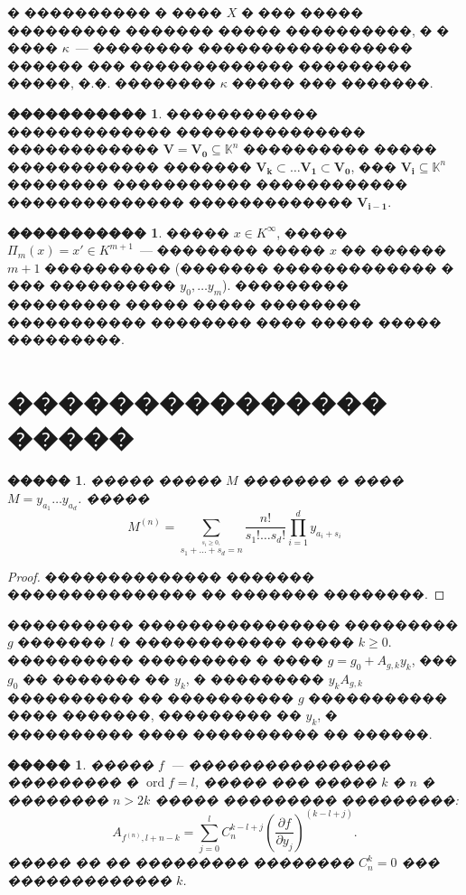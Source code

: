 \documentclass[16pt]{article}
\DeclareMathOperator{\ord}{ord}
\renewcommand{\ge}{\geqslant} %
\theoremstyle{plain}
\newtheorem{lemma}[theorem]{�����}
\theoremstyle{definition}
\newtheorem{definition}[theorem]{�����������}
\theoremstyle{remark}
\begin{document}
� ���������� � ���� $X$ � ��� ����� ��������� ������� �����
����������, � � ���� $\kappa$~--- �������� ����������������� ������
��� ������������� ��������� �����, �.�. �������� $\kappa$
����� ��� �������.


\begin{definition} ������������ ������������� ��������������� ������������
$\mathbf{V}=\mathbf{V_0}\subseteq \mathbb{K}^n$ ���������� ����� ������������ �������
$\mathbf{V_k}\subset\ldots\mathbf{V_1}\subset\mathbf{V_0}$, ���
$\mathbf{V_i}\subseteq \mathbb{K}^n$ �������� ����������� ������������ �������������� �������������
$\mathbf{V_{i-1}}$.
\end{definition}

\begin{definition}
����� $x\in K^{\infty}$, ����� $\Pi_m(x)=x'\in K^{m+1}$~--- ��������
����� $x$ �� ������ $m+1$ ���������� (������� ������������� � ���
���������� $y_0,\ldots y_m$). ��������� ��������� ����� ����� �������� ����������� �������� ���� ����� ����� ���������.
\end{definition}

\section{ ��������������� �����}


\begin{lemma}\label{lemma:der_monom}
����� ����� $M$ ������� � ���� $M=y_{a_1}\ldots y_{a_d}$. �����
$$
M^{(n)} =\sum\limits_{\stackrel{s_i\geqslant0,}{
s_1+\ldots+s_d=n}}\frac{n!}{s_1!\ldots s_d!}
\prod\limits_{i=1}^dy_{a_i+s_i}
$$
\end{lemma}
\begin{proof}
�������������� ������� ��������������� �� ������� ��������.
\end{proof}
���������� ���������������� ��������� $g$ ������� $l$ � ������������
����� $k\ge0$. ���������� ��������� � ���� $g=g_0+A_{g,k}y_k$, ���
$g_0$ �� ������� �� $y_k$, � ��������� $y_kA_{g,k}$ ���������� ��
���������� $g$ ����������� ���� �������, ��������� �� $y_k$, �
���������� ���� ���������� �� ������.


\begin{lemma}\label{lemma:A_fn}
����� $f$~--- ���������������� ��������� � $\ord f = l$, �����
��� ����� $k$ � $n$ � �������� $n>2k$ ����� ���������
���������:
$$
A_{f^{(n)}, l + n - k}=\sum\limits_{j=0}^{l}C_n^{k - l + j
}\left(\frac{\partial f}{\partial y_j}\right)^{(k - l + j)}.
$$
����� �� �� ��������� �������� $C_n^{k}=0$ ��� �������������
$k$.
\end{lemma}
\end{document}
